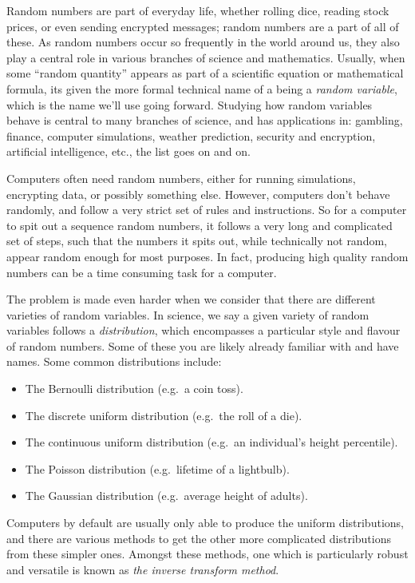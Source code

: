 \documentclass[11pt,a4paper,twoside,english]{extarticle}
\begin{document}
Random numbers are part of everyday life, whether rolling dice, reading stock prices, or even sending encrypted messages; random numbers are a part of all of these. As random numbers occur so frequently in the world around us, they also play a central role in various branches of science and mathematics. Usually, when some ``random quantity'' appears as part of a scientific equation or mathematical formula, its given the more formal technical name of a being a \emph{random variable}, which is the name we'll use going forward. Studying how random variables behave is central to many branches of science, and has applications in: gambling, finance, computer simulations, weather prediction, security and encryption, artificial intelligence, etc., the list goes on and on.  

Computers often need random numbers, either for running simulations, encrypting data, or possibly something else. However, computers don't behave randomly, and follow a very strict set of rules and instructions. So for a computer to spit out a sequence random numbers, it follows a very long and complicated set of steps, such that the numbers it spits out, while technically not random, appear random enough for most purposes. In fact, producing high quality random numbers can be a time consuming task for a computer.

The problem is made even harder when we consider that there are different varieties of random variables. In science, we say a given variety of random variables follows a \emph{distribution}, which encompasses a particular style and flavour of random numbers. Some of these you are likely already familiar with and  have names. Some common distributions include:
\begin{itemize}
\item The Bernoulli distribution (e.g.\ a coin toss).
\item The discrete uniform distribution (e.g.\ the roll of a die).
\item The continuous uniform distribution (e.g.\ an individual's height percentile).
\item The Poisson distribution (e.g.\ lifetime of a lightbulb). 
\item The Gaussian distribution (e.g.\ average height of adults).
\end{itemize}

Computers by default are usually only able to produce the uniform distributions, and there are various methods to get the other more complicated distributions from these simpler ones. Amongst these methods, one which is particularly robust and versatile is known as \emph{the inverse transform method}.
\end{document}
